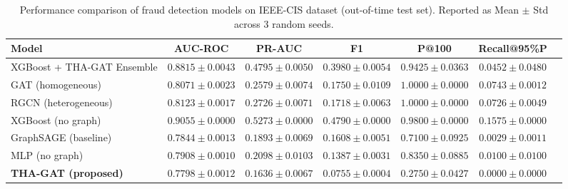 \begin{table}[t]
\caption{Performance comparison of fraud detection models on IEEE-CIS dataset (out-of-time test set). Reported as Mean $\pm$ Std across 3 random seeds.}
\label{tab:comparison}
\centering
\begin{tabular}{lcccccc}
\toprule
\textbf{Model} & \textbf{AUC-ROC} & \textbf{PR-AUC} & \textbf{F1} & \textbf{P@100} & \textbf{Recall@95\%P} \\
\midrule
XGBoost + THA-GAT Ensemble & $0.8815 \pm 0.0043$ & $0.4795 \pm 0.0050$ & $0.3980 \pm 0.0054$ & $0.9425 \pm 0.0363$ & $0.0452 \pm 0.0480$ \\
GAT (homogeneous) & $0.8071 \pm 0.0023$ & $0.2579 \pm 0.0074$ & $0.1750 \pm 0.0109$ & $1.0000 \pm 0.0000$ & $0.0743 \pm 0.0012$ \\
RGCN (heterogeneous) & $0.8123 \pm 0.0017$ & $0.2726 \pm 0.0071$ & $0.1718 \pm 0.0063$ & $1.0000 \pm 0.0000$ & $0.0726 \pm 0.0049$ \\
XGBoost (no graph) & $0.9055 \pm 0.0000$ & $0.5273 \pm 0.0000$ & $0.4790 \pm 0.0000$ & $0.9800 \pm 0.0000$ & $0.1575 \pm 0.0000$ \\
GraphSAGE (baseline) & $0.7844 \pm 0.0013$ & $0.1893 \pm 0.0069$ & $0.1608 \pm 0.0051$ & $0.7100 \pm 0.0925$ & $0.0029 \pm 0.0011$ \\
MLP (no graph) & $0.7908 \pm 0.0010$ & $0.2098 \pm 0.0103$ & $0.1387 \pm 0.0031$ & $0.8350 \pm 0.0885$ & $0.0100 \pm 0.0100$ \\
\textbf{THA-GAT (proposed)} & $0.7798 \pm 0.0012$ & $0.1636 \pm 0.0067$ & $0.0755 \pm 0.0004$ & $0.2750 \pm 0.0427$ & $0.0000 \pm 0.0000$ \\
\bottomrule
\end{tabular}
\end{table}